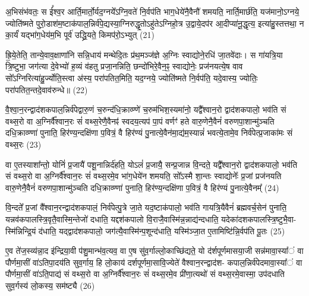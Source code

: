 अ॒भिसंभ॑वतः॒ स ई᳚श्व॒र आर्ति॒मार्तो॒र्यद॒ग्नये᳚\-ऽग्नि॒वते॑ नि॒र्वप॑ति भाग॒धेये॑नै॒वैनौ॑ शमयति॒ नार्ति॒मार्छ॑ति॒ यज॑मानो॒\-ऽग्नये॒ ज्योति॑ष्मते पुरो॒डाश॑म॒ष्टाक॑पाल॒न्निर्व॑पे॒द्यस्या॒ग्निरुद्धृ॒तो\-ऽहु॑ते\-ऽग्निहो॒त्र उ॒द्वाये॒दप॑र आ॒दीप्या॑नू॒द्धृत्य॒ इत्या॑हु॒स्तत्तथा॒ न का॒र्यं॑ यद्भा॑ग॒धेय॑म॒भि पूर्व॑ उद्ध्रि॒यते॒ किमप॑रो॒\-ऽभ्युत् (21)

ह्रि॒ये॒तेति॒ तान्ये॒वाव॒क्षाणा॑नि सन्नि॒धाय॑ मन्थेदि॒तः प्र॑थ॒मञ्ज॑ज्ञे अ॒ग्निः स्वाद्योने॒रधि॑ जा॒तवे॑दाः। स गा॑यत्रि॒या त्रि॒ष्टुभा॒ जग॑त्या दे॒वेभ्यो॑ ह॒व्यं व॑हतु प्रजा॒नन्निति॒ छन्दो॑भिरे॒वैन॒ꣴ॒ स्वाद्योनेः॒ प्रज॑नयत्ये॒ष वाव सो᳚\-ऽग्निरित्या॑हु॒र्ज्योति॒स्त्वा अ॑स्य॒ परा॑पतित॒मिति॒ यद॒ग्नये॒ ज्योति॑ष्मते नि॒र्वप॑ति॒ यदे॒वास्य॒ ज्योतिः॒ परा॑पतित॒न्तदे॒वाव॑रुन्धे॥ (22)

{\anuvakamend[{क॒रो॒त्य॒न्ना॒दो द॑धाति॒ यद॒ग्नये॒ शुच॑ये॒ चक्षु॑रे॒वास्मि॒न्तेन॑ दधाति करोति॒ वाजं॒ यज॑मान॒मुदे॒वास्य॒ षट्च॑॥४॥}]}

वै॒श्वा॒न॒रन्द्वाद॑शकपाल॒न्निर्व॑पेद्वारु॒णं च॒रुन्द॑धि॒क्राव्ण्णे॑ च॒रुम॑भिश॒स्यमा॑नो॒ यद्वै᳚श्वान॒रो द्वाद॑शकपालो॒ भव॑ति सं वथ्स॒रो वा अ॒ग्निर्वै᳚श्वान॒रः सं॑ वथ्स॒रेणै॒वैनꣴ॑ स्वदय॒त्यप॑ पा॒पं वर्णꣳ॑ हते वारु॒णेनै॒वैनं॑ वरुणपा॒शान्मु॑ञ्चति दधि॒क्राव्ण्णा॑ पुनाति॒ हिर॑ण्य॒न्दक्षि॑णा प॒वित्रं॒ वै हिर॑ण्यं पु॒नात्ये॒वैन॑मा॒द्य॑म॒स्यान्नं॑ भवत्ये॒तामे॒व निर्व॑पेत्प्र॒जाका॑मः सं वथ्स॒रः (23)

वा ए॒तस्याशा᳚न्तो॒ योनिं॑ प्र॒जायै॑ पशू॒नान्निर्द॑हति॒ यो\-ऽलं॑ प्र॒जायै॒ सन्प्र॒जान्न वि॒न्दते॒ यद्वै᳚श्वान॒रो द्वाद॑शकपालो॒ भव॑ति सं वथ्स॒रो वा अ॒ग्निर्वै᳚श्वान॒रः सं॑ वथ्स॒रमे॒व भा॑ग॒धेये॑न शमयति॒ सो᳚\-ऽस्मै शा॒न्तः स्वाद्योनेः᳚ प्र॒जां प्रज॑नयति वारु॒णेनै॒वैनं॑ वरुणपा॒शान्मु॑ञ्चति दधि॒क्राव्ण्णा॑ पुनाति॒ हिर॑ण्य॒न्दक्षि॑णा प॒वित्रं॒ वै हिर॑ण्यं पु॒नात्ये॒वैनम्᳚ (24)

वि॒न्दते᳚ प्र॒जां वै᳚श्वान॒रन्द्वाद॑शकपालं॒ निर्व॑पेत्पु॒त्रे जा॒ते यद॒ष्टाक॑पालो॒ भव॑ति गायत्रि॒यैवैनं॑ ब्रह्मवर्च॒सेन॑ पुनाति॒ यन्नव॑कपालस्त्रि॒वृतै॒वास्मि॒न्तेजो॑ दधाति॒ यद्दश॑कपालो वि॒राजै॒वास्मि॑न्न॒न्नाद्य॑न्दधाति॒ यदेका॑दशकपालस्त्रि॒ष्टुभै॒वा- स्मि॑न्निन्द्रि॒यं द॑धाति॒ यद्द्वाद॑शकपालो॒ जग॑त्यै॒वास्मि॑न्प॒शून्द॑धाति॒ यस्मि॑ञ्जा॒त ए॒तामिष्टि॑न्नि॒र्वप॑ति पू॒तः (25)

ए॒व ते॑ज॒स्व्य॑न्ना॒द इ॑न्द्रिया॒वी प॑शु॒मान्भ॑व॒त्यव॒ वा ए॒ष सु॑व॒र्गाल्लो॒काच्छि॑द्यते॒ यो द॑र्\mbox{}शपूर्णमासया॒जी सन्न॑मावा॒स्या᳚ं वा पौर्णमा॒सीं वा॑\-ऽतिपा॒दय॑ति सुव॒र्गाय॒ हि लो॒काय॑ दर्\mbox{}शपूर्णमा॒सावि॒ज्येते॑ वैश्वान॒रन्द्वाद॑श- कपाल॒न्निर्व॑पेदमावा॒स्या᳚ं वा पौर्णमा॒सीं वा॑\-ऽति॒पाद्य॑ सं वथ्स॒रो वा अ॒ग्निर्वै᳚श्वान॒रः सं॑ वथ्स॒रमे॒व प्री॑णा॒त्यथो॑ सं वथ्स॒रमे॒वास्मा॒ उप॑दधाति सुव॒र्गस्य॑ लो॒कस्य॒ सम॑ष्ट्यै (26)

